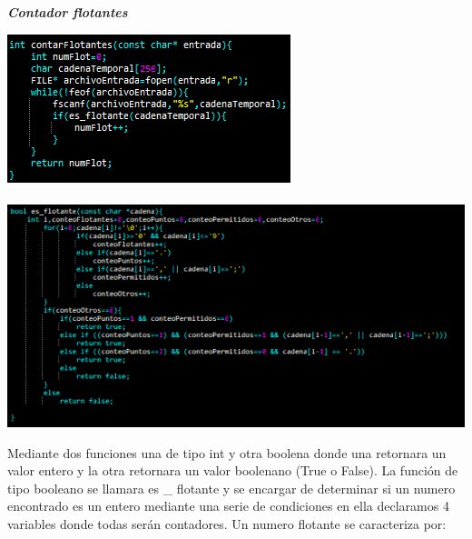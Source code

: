 \documentclass[12pt,letterpaper]{report}
\begin{document}
\newpage
\textbf{\textit{\em{Contador flotantes}}}
\begin{multicols}{2}

\includegraphics[scale=0.9]{punto9-2}\\\\
\includegraphics[scale=0.6]{punto9-22}\\

\end{multicols}
Mediante dos funciones una de tipo int y otra boolena donde una retornara un valor entero y la otra retornara un valor boolenano (True o False). 
La función de tipo booleano se llamara es \_ flotante y se encargar de determinar si un numero encontrado es un entero mediante una serie de condiciones en ella declaramos 4 variables donde todas serán contadores. Un numero flotante se caracteriza por: 
\end{document}
